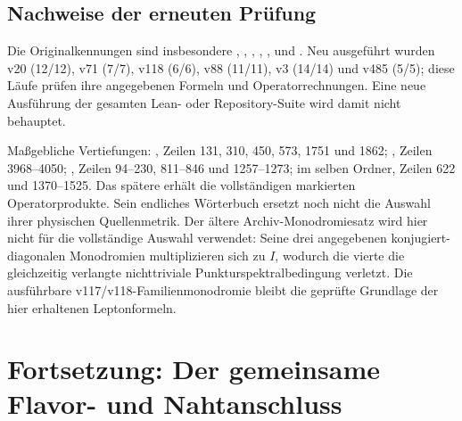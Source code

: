 \subsection{Nachweise der erneuten Prüfung}
Die Originalkennungen sind insbesondere , , , , ,  und . Neu ausgeführt wurden v20 (12/12), v71 (7/7), v118 (6/6), v88 (11/11), v3 (14/14) und v485 (5/5); diese Läufe prüfen ihre angegebenen Formeln und Operatorrechnungen. Eine neue Ausführung der gesamten Lean- oder Repository-Suite wird damit nicht behauptet.

Maßgebliche Vertiefungen: , Zeilen 131, 310, 450, 573, 1751 und 1862; , Zeilen 3968--4050; , Zeilen 94--230, 811--846 und 1257--1273;  im selben Ordner, Zeilen 622 und 1370--1525. Das spätere  erhält die vollständigen markierten Operatorprodukte. Sein endliches Wörterbuch ersetzt noch nicht die Auswahl ihrer physischen Quellenmetrik. Der ältere Archiv-Monodromiesatz wird hier nicht für die vollständige Auswahl verwendet: Seine drei angegebenen konjugiert-diagonalen Monodromien multiplizieren sich zu $I$, wodurch die vierte die gleichzeitig verlangte nichttriviale Punkturspektralbedingung verletzt. Die ausführbare v117/v118-Familienmonodromie bleibt die geprüfte Grundlage der hier erhaltenen Leptonformeln.

\section{Fortsetzung: Der gemeinsame Flavor- und Nahtanschluss}\label{sec:operatorbridge}


